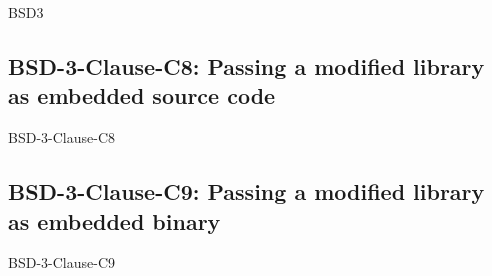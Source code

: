 \begin{license}{BSD3}
\subsection{BSD-3-Clause-C8: Passing a modified library as embedded source code}
\begin{lsuc}{BSD-3-Clause-C8}

  \lsucmeans{\useCaseEight}
  \lsuccovers{\coversEight}

  \begin{lsucrequires}
    \lsucmandatory{\keepLicenseElements}
    \lsucoptional{\addLibraryLicenseToCopyrightMessage}
    \lsucoptional{\keepSourcesSeparate}
  \end{lsucrequires}

  \begin{lsucprohibits}
    \lsucitem{\dontUseAuthorNames}%
  \end{lsucprohibits}
\end{lsuc}

\subsection{BSD-3-Clause-C9: Passing a modified library as embedded binary}
\begin{lsuc}{BSD-3-Clause-C9}

  \lsucmeans{\useCaseNine}
  \lsuccovers{\coversNine}

  \begin{lsucrequires}
    \lsucmandatory{\insertLicenseIntoBinary}\passingFilesCorrectly
    \lsucoptional{\addLibraryLicenseToCopyrightMessage}
    \lsucoptional{\keepBinariesSeparate}
  \end{lsucrequires}

  \begin{lsucprohibits}
    \lsucitem{\dontUseAuthorNames}%
  \end{lsucprohibits}
\end{lsuc}

\end{license}


